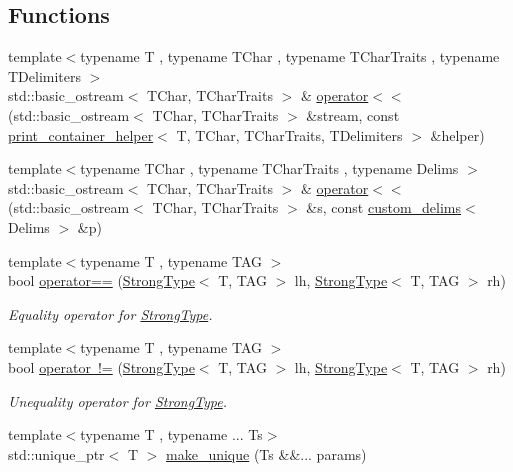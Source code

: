 \subsection*{Functions}
\begin{DoxyCompactItemize}
\item 
{\footnotesize template$<$typename T , typename T\+Char , typename T\+Char\+Traits , typename T\+Delimiters $>$ }\\std\+::basic\+\_\+ostream$<$ T\+Char, T\+Char\+Traits $>$ \& \mbox{\hyperlink{namespaceutils_ae2340b0fc8a712051acfd8f2fc1fc661}{operator$<$$<$}} (std\+::basic\+\_\+ostream$<$ T\+Char, T\+Char\+Traits $>$ \&stream, const \mbox{\hyperlink{structutils_1_1print__container__helper}{print\+\_\+container\+\_\+helper}}$<$ T, T\+Char, T\+Char\+Traits, T\+Delimiters $>$ \&helper)
\item 
{\footnotesize template$<$typename T\+Char , typename T\+Char\+Traits , typename Delims $>$ }\\std\+::basic\+\_\+ostream$<$ T\+Char, T\+Char\+Traits $>$ \& \mbox{\hyperlink{namespaceutils_a40fe8534b73b6f60778ed6822109fd33}{operator$<$$<$}} (std\+::basic\+\_\+ostream$<$ T\+Char, T\+Char\+Traits $>$ \&s, const \mbox{\hyperlink{structutils_1_1custom__delims}{custom\+\_\+delims}}$<$ Delims $>$ \&p)
\item 
{\footnotesize template$<$typename T , typename T\+AG $>$ }\\bool \mbox{\hyperlink{namespaceutils_afcac2dfc0ae32f7465fafd54d96d8bf5}{operator==}} (\mbox{\hyperlink{classutils_1_1_strong_type}{Strong\+Type}}$<$ T, T\+AG $>$ lh, \mbox{\hyperlink{classutils_1_1_strong_type}{Strong\+Type}}$<$ T, T\+AG $>$ rh)
\begin{DoxyCompactList}\small\item\em Equality operator for \mbox{\hyperlink{classutils_1_1_strong_type}{Strong\+Type}}. \end{DoxyCompactList}\item 
{\footnotesize template$<$typename T , typename T\+AG $>$ }\\bool \mbox{\hyperlink{namespaceutils_a8acda383c497ae0fc6eff785ebaeb1ef}{operator !=}} (\mbox{\hyperlink{classutils_1_1_strong_type}{Strong\+Type}}$<$ T, T\+AG $>$ lh, \mbox{\hyperlink{classutils_1_1_strong_type}{Strong\+Type}}$<$ T, T\+AG $>$ rh)
\begin{DoxyCompactList}\small\item\em Unequality operator for \mbox{\hyperlink{classutils_1_1_strong_type}{Strong\+Type}}. \end{DoxyCompactList}\item 
{\footnotesize template$<$typename T , typename ... Ts$>$ }\\std\+::unique\+\_\+ptr$<$ T $>$ \mbox{\hyperlink{namespaceutils_a5d986c00482350e10d6088f787e1add3}{make\+\_\+unique}} (Ts \&\&... params)
\end{DoxyCompactItemize}


